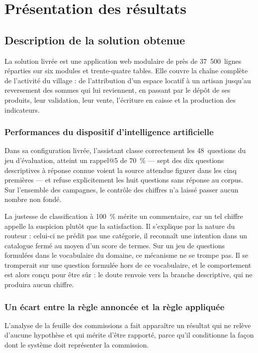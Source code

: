 \section{Présentation des résultats}
\label{sec:4-2}

\subsection{Description de la solution obtenue}

La solution livrée est une application web modulaire de près de 37~500~lignes réparties sur six modules et trente-quatre tables. Elle couvre la chaîne complète de l'activité du village : de l'attribution d'un espace locatif à un artisan jusqu'au reversement des sommes qui lui reviennent, en passant par le dépôt de ses produits, leur validation, leur vente, l'écriture en caisse et la production des indicateurs.

\subsubsection{Performances du dispositif d'intelligence artificielle}

Dans sa configuration livrée, l'assistant classe correctement les 48~questions du jeu d'évaluation, atteint un rappel@5 de 70~\% --- sept des dix questions descriptives à réponse connue voient la source attendue figurer dans les cinq premières --- et refuse explicitement les huit questions sans réponse au corpus. Sur l'ensemble des campagnes, le contrôle des chiffres n'a laissé passer aucun nombre non fondé.

La justesse de classification à 100~\% mérite un commentaire, car un tel chiffre appelle la suspicion plutôt que la satisfaction. Il s'explique par la nature du routeur : celui-ci ne prédit pas une catégorie, il reconnaît une intention dans un catalogue fermé au moyen d'un score de termes. Sur un jeu de questions formulées dans le vocabulaire du domaine, ce mécanisme ne se trompe pas. Il se tromperait sur une question formulée hors de ce vocabulaire, et le comportement est alors conçu pour être sûr : le doute renvoie vers la branche descriptive, qui ne produira aucun chiffre.

\subsubsection{Un écart entre la règle annoncée et la règle appliquée}

L'analyse de la feuille des commissions a fait apparaître un résultat qui ne relève d'aucune hypothèse et qui mérite d'être rapporté, parce qu'il conditionne la façon dont le système doit représenter la commission.

